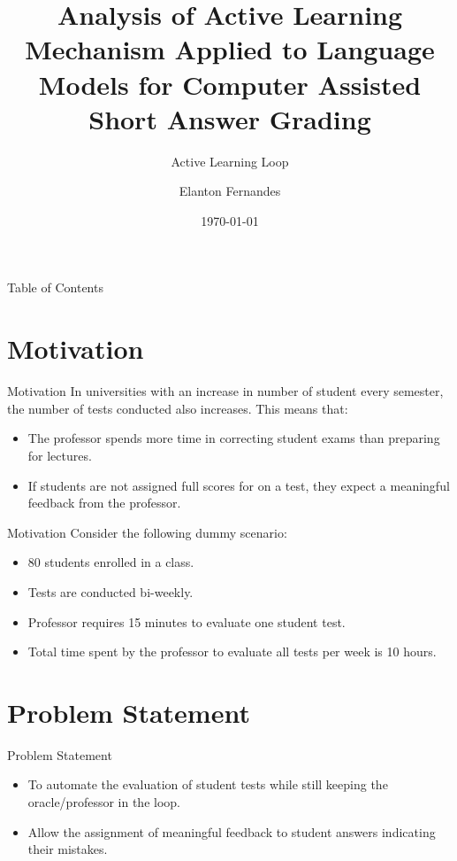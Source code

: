 \documentclass[aspectratio=169]{beamer}
\author[Elanton Fernandes]{Elanton Fernandes}
\subtitle{Active Learning Loop}
\title{Analysis of Active Learning Mechanism Applied to Language Models for Computer Assisted Short Answer Grading}
\institute[HBRS]{Hochschule Bonn-Rhein-Sieg}
\date{\today}
\begin{document}
{
\begin{frame}
\titlepage
\end{frame}
\begin{frame}{Table of Contents}
\tableofcontents
\end{frame}
}


\section{Motivation}
\begin{frame}{Motivation}
	In universities with an increase in number of student every semester, the number of tests conducted also increases. This means that:
	\begin{itemize}
		\item The professor spends more time in correcting student exams than preparing for lectures.
		\item If students are not assigned full scores for on a test, they expect a meaningful feedback from the professor.
	\end{itemize}
\end{frame}
\begin{frame}{Motivation}
	Consider the following dummy scenario:
	\begin{itemize}
		\item 80 students enrolled in a class.
		\item Tests are conducted bi-weekly.
		\item Professor requires 15 minutes to evaluate one student test.
		\item Total time spent by the professor to evaluate all tests per week is 10 hours. 
	\end{itemize}
\end{frame}
\section{Problem Statement}
\begin{frame}{Problem Statement}
	\begin{itemize}
		\item To automate the evaluation of student tests while still keeping the oracle/professor in the loop.
		\item Allow the assignment of meaningful feedback to student answers indicating their mistakes.
	\end{itemize}
	
\end{frame}
\end{document}
